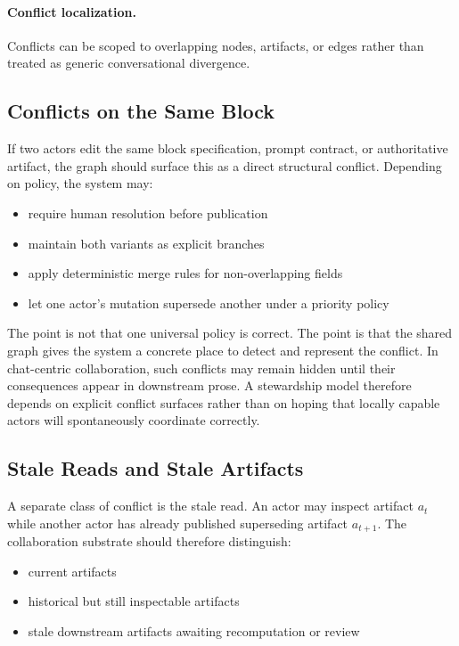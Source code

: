 \documentclass{article}
\begin{document}
\paragraph{Conflict localization.}
Conflicts can be scoped to overlapping nodes, artifacts, or edges rather than treated as generic conversational divergence.

\subsection{Conflicts on the Same Block}

If two actors edit the same block specification, prompt contract, or authoritative artifact, the graph should surface this as a direct structural conflict. Depending on policy, the system may:
\begin{itemize}
\item require human resolution before publication
\item maintain both variants as explicit branches
\item apply deterministic merge rules for non-overlapping fields
\item let one actor's mutation supersede another under a priority policy
\end{itemize}

The point is not that one universal policy is correct. The point is that the shared graph gives the system a concrete place to detect and represent the conflict. In chat-centric collaboration, such conflicts may remain hidden until their consequences appear in downstream prose. A stewardship model therefore depends on explicit conflict surfaces rather than on hoping that locally capable actors will spontaneously coordinate correctly.

\subsection{Stale Reads and Stale Artifacts}

A separate class of conflict is the stale read. An actor may inspect artifact $a_t$ while another actor has already published superseding artifact $a_{t+1}$. The collaboration substrate should therefore distinguish:
\begin{itemize}
\item current artifacts
\item historical but still inspectable artifacts
\item stale downstream artifacts awaiting recomputation or review
\end{itemize}
\end{document}
